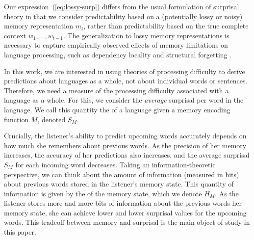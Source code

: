 



Our expression~(\ref{eq:lossy-surp}) differs from the usual formulation of surprisal theory in that we consider predictability based on a (potentially lossy or noisy) memory representation $m_t$, rather than predictability based on the true complete context $w_1, \dots, w_{t-1}$. The generalization to lossy memory representations is necessary to capture empirically observed effects of memory limitations on language processing, such as dependency locality and structural forgetting \citep{futrell2020lossy}. 

In this work, we are interested in using theories of processing difficulty to derive predictions about languages as a whole, not about individual words or sentences. Therefore, we need a measure of the processing difficulty associated with a language as a whole. For this, we consider the \emph{average} surprisal per word in the language. We call this quantity the  of a language given a memory encoding function $M$, denoted $S_M$.

Crucially, the listener's ability to predict upcoming words accurately depends on how much she remembers about previous words. As the precision of her memory increases, the accuracy of her predictions also increases, and the average surprisal $S_M$ for each incoming word decreases. Taking an information-theoretic perspective, we can think about the amount of information (measured in bits) about previous words stored in the listener's memory state. This quantity of information is given by the  of the memory state, which we denote $H_M$. As the listener stores more and more bits of information about the previous words her memory state, she can achieve lower and lower surprisal values for the upcoming words. This tradeoff between memory and surprisal is the main object of study in this paper.

